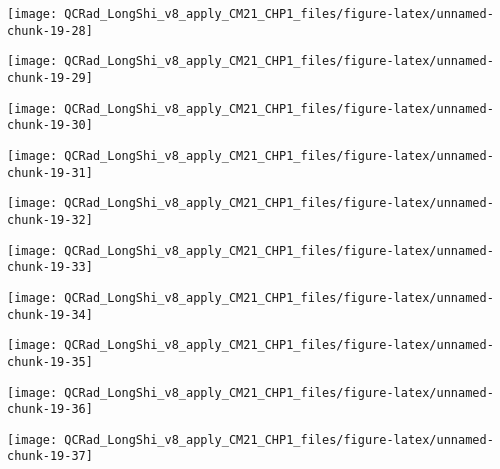 \documentclass[
  10pt,
  a4paper,oneside]{article}
\begin{document}
\begin{center}\texttt{[image: QCRad\_LongShi\_v8\_apply\_CM21\_CHP1\_files/figure-latex/unnamed-chunk-19-28]} \end{center}

\begin{center}\texttt{[image: QCRad\_LongShi\_v8\_apply\_CM21\_CHP1\_files/figure-latex/unnamed-chunk-19-29]} \end{center}

\begin{center}\texttt{[image: QCRad\_LongShi\_v8\_apply\_CM21\_CHP1\_files/figure-latex/unnamed-chunk-19-30]} \end{center}

\begin{center}\texttt{[image: QCRad\_LongShi\_v8\_apply\_CM21\_CHP1\_files/figure-latex/unnamed-chunk-19-31]} \end{center}

\begin{center}\texttt{[image: QCRad\_LongShi\_v8\_apply\_CM21\_CHP1\_files/figure-latex/unnamed-chunk-19-32]} \end{center}

\begin{center}\texttt{[image: QCRad\_LongShi\_v8\_apply\_CM21\_CHP1\_files/figure-latex/unnamed-chunk-19-33]} \end{center}

\begin{center}\texttt{[image: QCRad\_LongShi\_v8\_apply\_CM21\_CHP1\_files/figure-latex/unnamed-chunk-19-34]} \end{center}

\begin{center}\texttt{[image: QCRad\_LongShi\_v8\_apply\_CM21\_CHP1\_files/figure-latex/unnamed-chunk-19-35]} \end{center}

\begin{center}\texttt{[image: QCRad\_LongShi\_v8\_apply\_CM21\_CHP1\_files/figure-latex/unnamed-chunk-19-36]} \end{center}

\begin{center}\texttt{[image: QCRad\_LongShi\_v8\_apply\_CM21\_CHP1\_files/figure-latex/unnamed-chunk-19-37]} \end{center}
\end{document}
